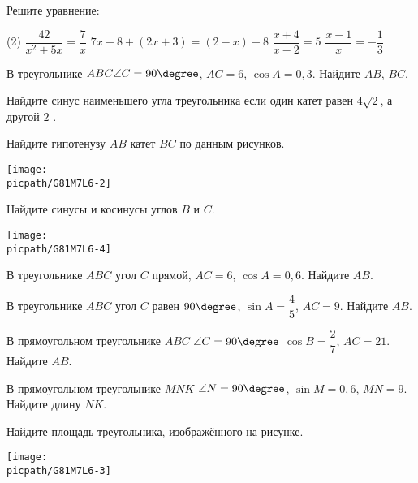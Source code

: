 \begin{class}[number=6]
	\begin{listofex}
		\item Решите уравнение:
		\begin{tasks}(2)
			\task \( \dfrac{42}{x^{2}+5x}=\dfrac{7}{x} \)
			\task \( 7x + 8 +(2x+3) = (2-x) + 8 \)
			\task \( \dfrac{x+4}{x-2}=5 \)
			\task \( \dfrac{x-1}{x}=-\dfrac{1}{3} \)
		\end{tasks}
		\item В треугольнике \(ABC \angle C = 90\degree \), \( AC = 6 \), \( \cos A = 0,3 \). Найдите \( AB \), \( BC \).
		\item Найдите синус наименьшего угла треугольника если один катет равен \( 4\sqrt{2} \), а другой \( 2 \) .
		\item 
		\begin{minipage}[t]{\bodywidth}
			Найдите гипотенузу \( AB \) катет \( BC \) по данным рисунков.
		\end{minipage}
		\hspace{0.02\linewidth}
		\begin{minipage}[t]{\picwidth}
			\texttt{[image: \\picpath/G81M7L6-2]}
		\end{minipage}
		\item \begin{minipage}[t]{\bodywidth}
			Найдите синусы и косинусы углов \( B \) и \( C \).
		\end{minipage}
		\hspace{0.02\linewidth}
		\begin{minipage}[t]{\picwidth}
			\texttt{[image: \\picpath/G81M7L6-4]}
		\end{minipage}
		\item В треугольнике \( ABC \) угол \( C \) прямой,
		\( AC=6 \), \( \cos A=0,6 \). Найдите \( AB \).
		\item В треугольнике \( ABC \) угол \( C \) равен \( 90\degree \), \( \sin A=\dfrac{4}{5} \), \( AC=9 \). Найдите \( AB \).
		\item В прямоугольном треугольнике \( ABC \) \( \angle C=90\degree \) \( \cos B=\dfrac{2}{7} \), \( AC=21 \). Найдите \( AB \).
		\item В прямоугольном треугольнике \( MNK \) \( \angle N = 90\degree \), \( \sin M = 0,6 \), \( MN=9 \). Найдите длину \( NK \).
		\item 
		\begin{minipage}[t]{\bodywidth}
			Найдите площадь треугольника, изображённого на
			рисунке.
		\end{minipage}
		\hspace{0.02\linewidth}
		\begin{minipage}[t]{\picwidth}
			\texttt{[image: \\picpath/G81M7L6-3]}
		\end{minipage}
	\end{listofex}
\end{class}

